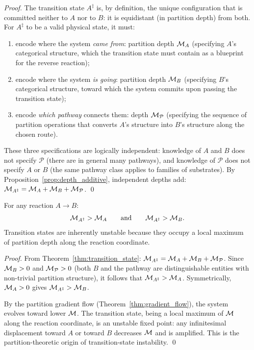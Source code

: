 \begin{proof}
The transition state $A^\ddagger$ is, by definition, the unique configuration
that is committed neither to $A$ nor to $B$: it is equidistant (in partition
depth) from both. For $A^\ddagger$ to be a valid physical state, it must:
\begin{enumerate}[label=(\roman*)]
  \item encode where the system \emph{came from}: partition depth $\mathcal{M}_A$
        (specifying $A$'s categorical structure, which the transition state
        must contain as a blueprint for the reverse reaction);
  \item encode where the system \emph{is going}: partition depth $\mathcal{M}_B$
        (specifying $B$'s categorical structure, toward which the system commits
        upon passing the transition state);
  \item encode \emph{which pathway} connects them: depth $\mathcal{M}_{\mathcal{P}}$
        (specifying the sequence of partition operations that converts $A$'s
        structure into $B$'s structure along the chosen route).
\end{enumerate}
These three specifications are logically independent: knowledge of $A$ and $B$
does not specify $\mathcal{P}$ (there are in general many pathways), and
knowledge of $\mathcal{P}$ does not specify $A$ or $B$ (the same pathway class
applies to families of substrates). By Proposition~\ref{prop:depth_additive},
independent depths add:
$\mathcal{M}_{A^\ddagger} = \mathcal{M}_A + \mathcal{M}_B + \mathcal{M}_{\mathcal{P}}$. \qed
\end{proof}

\begin{corollary}
\label{cor:ts_unstable}
For any reaction $A \to B$:
\begin{equation}
  \mathcal{M}_{A^\ddagger} > \mathcal{M}_A \qquad \text{and} \qquad \mathcal{M}_{A^\ddagger} > \mathcal{M}_B.
\end{equation}
Transition states are inherently unstable because they occupy a local maximum
of partition depth along the reaction coordinate.
\end{corollary}

\begin{proof}
From Theorem~\ref{thm:transition_state}:
$\mathcal{M}_{A^\ddagger} = \mathcal{M}_A + \mathcal{M}_B + \mathcal{M}_{\mathcal{P}}$.
Since $\mathcal{M}_B > 0$ and $\mathcal{M}_{\mathcal{P}} > 0$ (both $B$ and the pathway
are distinguishable entities with non-trivial partition structure), it follows that
$\mathcal{M}_{A^\ddagger} > \mathcal{M}_A$. Symmetrically, $\mathcal{M}_A > 0$ gives
$\mathcal{M}_{A^\ddagger} > \mathcal{M}_B$.

By the partition gradient flow (Theorem~\ref{thm:gradient_flow}), the system
evolves toward lower $\mathcal{M}$. The transition state, being a local maximum of
$\mathcal{M}$ along the reaction coordinate, is an unstable fixed point: any
infinitesimal displacement toward $A$ or toward $B$ decreases $\mathcal{M}$ and is
amplified. This is the partition-theoretic origin of transition-state instability. \qed
\end{proof}

